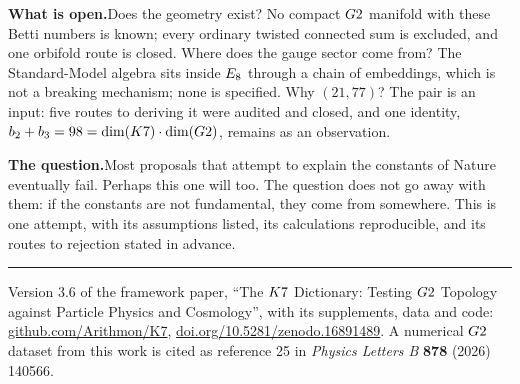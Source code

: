 \documentclass[10pt,a4paper]{article}
\begin{document}
{\vspace{0.2em}
\noindent\textbf{What is open.}\enspace Does the geometry exist? No
compact $G2$ manifold with these Betti numbers is known; every ordinary
twisted connected sum is excluded, and one orbifold route is closed. Where
does the gauge sector come from? The Standard-Model algebra sits inside
$E_8$ through a chain of embeddings, which is not a breaking mechanism;
none is specified. Why $(21, 77)$? The pair is an input: five routes to
deriving it were audited and closed, and one identity, $b_2 + b_3 =
98 = \dim(K7) \cdot \dim(G2)$, remains as an observation.

\vspace{0.2em}
\noindent\textbf{The question.}\enspace Most proposals that attempt to
explain the constants of Nature eventually fail. Perhaps this one will
too. The question does not go away with them: if the constants are not
fundamental, they come from somewhere. This is one attempt, with its
assumptions listed, its calculations reproducible, and its routes to
rejection stated in advance.

\vspace{0.2em}
\noindent\rule{\textwidth}{0.2pt}

{\footnotesize\noindent Version 3.6 of the framework paper, ``The $K7$
Dictionary: Testing $G2$ Topology against Particle Physics and
Cosmology'', with its supplements, data and code:
\href{https://github.com/Arithmon/K7}{github.com/Arithmon/K7},
\href{https://doi.org/10.5281/zenodo.16891489}{doi.org/10.5281/zenodo.16891489}.
A numerical $G2$ dataset from this work is cited as reference 25 in
\emph{Physics Letters B} \textbf{878} (2026) 140566.\par}

}
\end{document}
